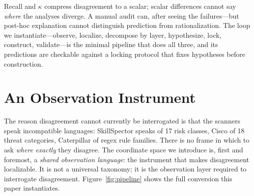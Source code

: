 \documentclass[sigconf,nonacm]{acmart}
\begin{document}
Recall and $\kappa$ compress disagreement to a scalar; scalar differences cannot say \emph{where} the analyses diverge. A manual audit can, after seeing the failures---but post-hoc explanation cannot distinguish prediction from rationalization. The loop we instantiate---observe, localize, decompose by layer, hypothesize, lock, construct, validate---is the minimal pipeline that does all three, and its predictions are checkable against a locking protocol that fixes hypotheses before construction.

\section{An Observation Instrument}
\label{sec:measure}

The reason disagreement cannot currently be interrogated is that the scanners speak incompatible languages: SkillSpector speaks of 17 risk classes, Cisco of 18 threat categories, Caterpillar of regex rule families. There is no frame in which to ask \emph{where exactly} they disagree. The coordinate space we introduce is, first and foremost, a \emph{shared observation language}: the instrument that makes disagreement localizable. It is not a universal taxonomy; it is the observation layer required to interrogate disagreement. Figure~\ref{fig:pipeline} shows the full conversion this paper instantiates.
\end{document}
